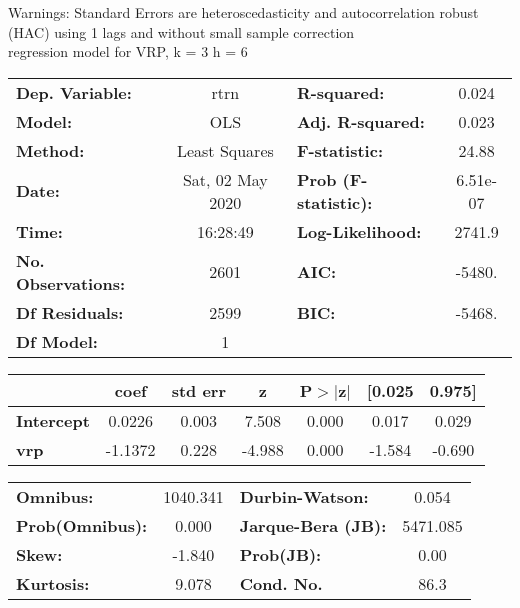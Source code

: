 Warnings: \newline
 [1] Standard Errors are heteroscedasticity and autocorrelation robust (HAC) using 1 lags and without small sample correction\\ 

regression model for VRP, k = 3 h = 6\begin{center}
\begin{tabular}{lclc}
\toprule
\textbf{Dep. Variable:}    &       rtrn       & \textbf{  R-squared:         } &     0.024   \\
\textbf{Model:}            &       OLS        & \textbf{  Adj. R-squared:    } &     0.023   \\
\textbf{Method:}           &  Least Squares   & \textbf{  F-statistic:       } &     24.88   \\
\textbf{Date:}             & Sat, 02 May 2020 & \textbf{  Prob (F-statistic):} &  6.51e-07   \\
\textbf{Time:}             &     16:28:49     & \textbf{  Log-Likelihood:    } &    2741.9   \\
\textbf{No. Observations:} &        2601      & \textbf{  AIC:               } &    -5480.   \\
\textbf{Df Residuals:}     &        2599      & \textbf{  BIC:               } &    -5468.   \\
\textbf{Df Model:}         &           1      & \textbf{                     } &             \\
\bottomrule
\end{tabular}
\begin{tabular}{lcccccc}
                   & \textbf{coef} & \textbf{std err} & \textbf{z} & \textbf{P$> |$z$|$} & \textbf{[0.025} & \textbf{0.975]}  \\
\midrule
\textbf{Intercept} &       0.0226  &        0.003     &     7.508  &         0.000        &        0.017    &        0.029     \\
\textbf{vrp}       &      -1.1372  &        0.228     &    -4.988  &         0.000        &       -1.584    &       -0.690     \\
\bottomrule
\end{tabular}
\begin{tabular}{lclc}
\textbf{Omnibus:}       & 1040.341 & \textbf{  Durbin-Watson:     } &    0.054  \\
\textbf{Prob(Omnibus):} &   0.000  & \textbf{  Jarque-Bera (JB):  } & 5471.085  \\
\textbf{Skew:}          &  -1.840  & \textbf{  Prob(JB):          } &     0.00  \\
\textbf{Kurtosis:}      &   9.078  & \textbf{  Cond. No.          } &     86.3  \\
\bottomrule
\end{tabular}
\end{center}

